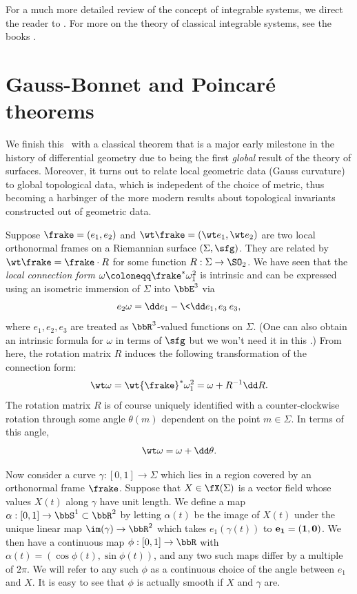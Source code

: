 For a much more detailed review of the concept of integrable systems, we direct the reader to \cite{deift}. For more on the theory of classical integrable systems, see the books \cite{moser,babelon}.





\section{Gauss-Bonnet and Poincar\'e theorems}\label{sec: gauss-bonnet}

We finish this \chap\ with a classical theorem that is a major early milestone in the history of differential geometry due to being the first \emph{global} result of the theory of surfaces. Moreover, it turns out to relate local geometric data (Gauss curvature) to global topological data, which is indepedent of the choice of metric, thus becoming a harbinger of the more modern results about topological invariants constructed out of geometric data.


Suppose $\frake=(e_1,e_2)$ and $\wt\frake=(\wt e_1,\wt e_2)$ are two local orthonormal frames on a Riemannian surface $(\Sigma,\sfg)$. They are related by $\wt\frake=\frake\cdot R$ for some function $R:\Sigma\to \SO_2$. We have seen that the \emph{local connection form} $\omega\coloneqq\frake^\ast\omega^2_1$ is intrinsic and can be expressed using an isometric immersion of $\Sigma$ into $\bbE^3$ via 
\[e_2\omega=\dd e_1-\<\dd e_1,e_3\>e_3,\] 
where $e_1,e_2,e_3$ are treated as $\bbR^3$-valued functions on $\Sigma$. (One can also obtain an intrinsic formula for $\omega$ in terms of $\sfg$ but we won't need it in this \chap.) From here, the rotation matrix $R$ induces the following transformation of the connection form:
\[\wt\omega =\wt{\frake}^\ast\omega^2_1=\omega+R^{-1}\dd R.\]
The rotation matrix $R$ is of course uniquely identified with a counter-clockwise rotation through some angle $\theta(m)$ dependent on the point $m\in \Sigma$. In terms of this angle, 
\[\wt\omega =\omega+\dd\theta.\label{eq 169}\]

Now consider a curve $\gamma:[0,1]\to \Sigma$ which lies in a region covered by an orthonormal frame $\frake$. Suppose that $X\in\fX(\Sigma)$ is a vector field whose values $X(t)$ along $\gamma$ have unit length. We define a map $\alpha:[0,1]\to \bbS^1\subset \bbR^2$ by letting $\alpha(t)$ be the image of $X(t)$ under the unique linear map $\im(\gamma)\to \bbR^2$ which takes $e_1(\gamma(t))$ to $\bf{e}_1=(1,0)$. We then have a continuous map $\phi:[0,1]\to \bbR$ with $\alpha(t)=(\cos\phi(t),\sin\phi(t))$, and any two such maps differ by a multiple of $2\pi$. We will refer to any such $\phi$ as a continuous choice of the angle between $e_1$ and $X$. It is easy to see that $\phi$ is actually smooth if $X$ and $\gamma$ are. 

